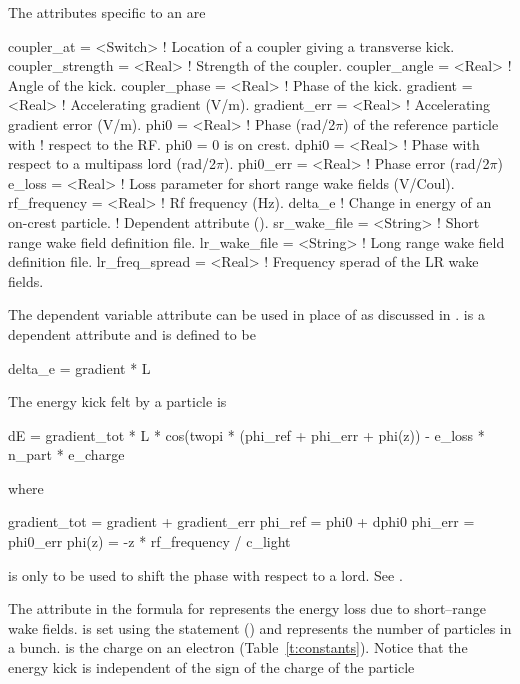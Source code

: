 {{The attributes specific to an  are 
\begin{example}
  coupler_at       = <Switch> ! Location of a coupler giving a transverse kick.
  coupler_strength = <Real>   ! Strength of the coupler.
  coupler_angle    = <Real>   ! Angle of the kick.
  coupler_phase    = <Real>   ! Phase of the kick.
  gradient         = <Real>   ! Accelerating gradient (V/m).
  gradient_err     = <Real>   ! Accelerating gradient error (V/m).
  phi0             = <Real>   ! Phase (rad/2\(\pi\)) of the reference particle with 
                              !   respect to the RF. phi0 = 0 is on crest.
  dphi0            = <Real>   ! Phase with respect to a multipass lord (rad/2\(\pi\)).
  phi0_err         = <Real>   ! Phase error (rad/2\(\pi\))
  e_loss           = <Real>   ! Loss parameter for short range wake fields (V/Coul).
  rf_frequency     = <Real>   ! Rf frequency (Hz).
  delta_e                     ! Change in energy of an on-crest particle. 
                              !   Dependent attribute ().
  sr_wake_file     = <String> ! Short range wake field definition file.
  lr_wake_file     = <String> ! Long range wake field definition file.
  lr_freq_spread   = <Real>   ! Frequency sperad of the LR wake fields.
\end{example}
The dependent variable  attribute can be used in place of
 as discussed in .   is a
dependent attribute and is defined to be
\begin{example}
  delta_e = gradient * L
\end{example}

The energy kick felt by a particle is 
\begin{example}
  dE = gradient_tot * L * cos(twopi * (phi_ref + phi_err + phi(z)) - 
                                                     e_loss * n_part * e_charge 
\end{example}
where
\begin{example}
  gradient_tot = gradient + gradient_err
  phi_ref = phi0 + dphi0
  phi_err = phi0_err
  phi(z) = -z * rf_frequency / c_light
\end{example}
 is only to be used to shift the phase with respect to a 
lord. See .

The  attribute in the formula for  represents the
energy loss due to short--range wake fields.  is set using
the  statement () and represents the
number of particles in a bunch.  is the charge on an
electron (Table~\ref{t:constants}). Notice that the energy kick is
independent of the sign of the charge of the particle

}}
